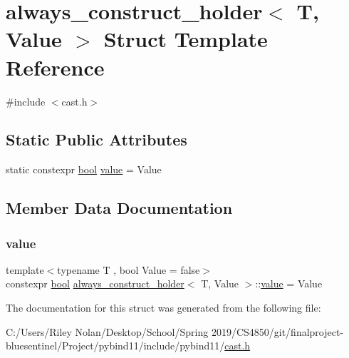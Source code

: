 \hypertarget{structalways__construct__holder}{}\section{always\+\_\+construct\+\_\+holder$<$ T, Value $>$ Struct Template Reference}
\label{structalways__construct__holder}


{\ttfamily \#include $<$cast.\+h$>$}

\subsection*{Static Public Attributes}
\begin{DoxyCompactItemize}
\item 
static constexpr \mbox{\hyperlink{asdl_8h_af6a258d8f3ee5206d682d799316314b1}{bool}} \mbox{\hyperlink{structalways__construct__holder_a4b536670cfc286d5257afad1eb4e407c}{value}} = Value
\end{DoxyCompactItemize}


\subsection{Member Data Documentation}
\mbox{\label{structalways__construct__holder_a4b536670cfc286d5257afad1eb4e407c}} 
\subsubsection{\texorpdfstring{value}{value}}
{\footnotesize\ttfamily template$<$typename T , bool Value = false$>$ \\
constexpr \mbox{\hyperlink{asdl_8h_af6a258d8f3ee5206d682d799316314b1}{bool}} \mbox{\hyperlink{structalways__construct__holder}{always\+\_\+construct\+\_\+holder}}$<$ T, Value $>$\+::\mbox{\hyperlink{_s_d_l__opengl__glext_8h_a8ad81492d410ff2ac11f754f4042150f}{value}} = Value\hspace{0.3cm}{\ttfamily [static]}}



The documentation for this struct was generated from the following file\+:\begin{DoxyCompactItemize}
\item 
C\+:/\+Users/\+Riley Nolan/\+Desktop/\+School/\+Spring 2019/\+C\+S4850/git/finalproject-\/bluesentinel/\+Project/pybind11/include/pybind11/\mbox{\hyperlink{cast_8h}{cast.\+h}}\end{DoxyCompactItemize}
